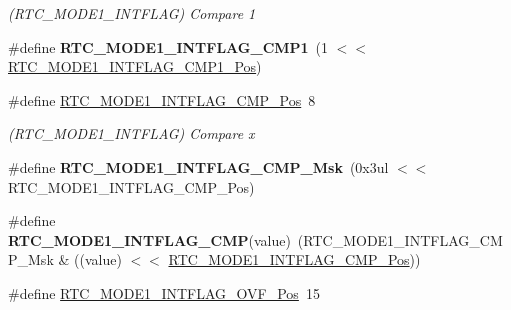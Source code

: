 \begin{DoxyCompactItemize}
\begin{DoxyCompactList}\small\item\em (R\+T\+C\+\_\+\+M\+O\+D\+E1\+\_\+\+I\+N\+T\+F\+L\+A\+G) Compare 1 \end{DoxyCompactList}\item 
\hypertarget{group___s_a_m_l21___r_t_c_ga8809b0ef2b71a61fb01ffe75d38a63a3}{}\#define {\bfseries R\+T\+C\+\_\+\+M\+O\+D\+E1\+\_\+\+I\+N\+T\+F\+L\+A\+G\+\_\+\+C\+M\+P1}~(1 $<$$<$ \hyperlink{group___s_a_m_l21___r_t_c_gabce18af92ef48a448cc57542d013bb73}{R\+T\+C\+\_\+\+M\+O\+D\+E1\+\_\+\+I\+N\+T\+F\+L\+A\+G\+\_\+\+C\+M\+P1\+\_\+\+Pos})\label{group___s_a_m_l21___r_t_c_ga8809b0ef2b71a61fb01ffe75d38a63a3}

\item 
\hypertarget{group___s_a_m_l21___r_t_c_ga6dd45ed1f9690f3407f26fb950160f8a}{}\#define \hyperlink{group___s_a_m_l21___r_t_c_ga6dd45ed1f9690f3407f26fb950160f8a}{R\+T\+C\+\_\+\+M\+O\+D\+E1\+\_\+\+I\+N\+T\+F\+L\+A\+G\+\_\+\+C\+M\+P\+\_\+\+Pos}~8\label{group___s_a_m_l21___r_t_c_ga6dd45ed1f9690f3407f26fb950160f8a}

\begin{DoxyCompactList}\small\item\em (R\+T\+C\+\_\+\+M\+O\+D\+E1\+\_\+\+I\+N\+T\+F\+L\+A\+G) Compare x \end{DoxyCompactList}\item 
\hypertarget{group___s_a_m_l21___r_t_c_gacaaf8c952c8871a27b9e6c1eeaee7640}{}\#define {\bfseries R\+T\+C\+\_\+\+M\+O\+D\+E1\+\_\+\+I\+N\+T\+F\+L\+A\+G\+\_\+\+C\+M\+P\+\_\+\+Msk}~(0x3ul $<$$<$ R\+T\+C\+\_\+\+M\+O\+D\+E1\+\_\+\+I\+N\+T\+F\+L\+A\+G\+\_\+\+C\+M\+P\+\_\+\+Pos)\label{group___s_a_m_l21___r_t_c_gacaaf8c952c8871a27b9e6c1eeaee7640}

\item 
\hypertarget{group___s_a_m_l21___r_t_c_gadff4787648e546f69600aa83a5d93be8}{}\#define {\bfseries R\+T\+C\+\_\+\+M\+O\+D\+E1\+\_\+\+I\+N\+T\+F\+L\+A\+G\+\_\+\+C\+M\+P}(value)~(R\+T\+C\+\_\+\+M\+O\+D\+E1\+\_\+\+I\+N\+T\+F\+L\+A\+G\+\_\+\+C\+M\+P\+\_\+\+Msk \& ((value) $<$$<$ \hyperlink{group___s_a_m_l21___r_t_c_ga6dd45ed1f9690f3407f26fb950160f8a}{R\+T\+C\+\_\+\+M\+O\+D\+E1\+\_\+\+I\+N\+T\+F\+L\+A\+G\+\_\+\+C\+M\+P\+\_\+\+Pos}))\label{group___s_a_m_l21___r_t_c_gadff4787648e546f69600aa83a5d93be8}

\item 
\hypertarget{group___s_a_m_l21___r_t_c_ga0ce9c7e6b11e3d4544f9d64384204eff}{}\#define \hyperlink{group___s_a_m_l21___r_t_c_ga0ce9c7e6b11e3d4544f9d64384204eff}{R\+T\+C\+\_\+\+M\+O\+D\+E1\+\_\+\+I\+N\+T\+F\+L\+A\+G\+\_\+\+O\+V\+F\+\_\+\+Pos}~15\label{group___s_a_m_l21___r_t_c_ga0ce9c7e6b11e3d4544f9d64384204eff}


\end{DoxyCompactItemize}
